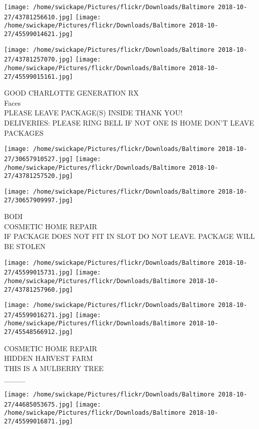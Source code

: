 \documentclass[10pt,letterpaper]{article}
\begin{document}
\texttt{[image: /home/swickape/Pictures/flickr/Downloads/Baltimore 2018-10-27/43781256610.jpg]}
\texttt{[image: /home/swickape/Pictures/flickr/Downloads/Baltimore 2018-10-27/45599014621.jpg]}

\texttt{[image: /home/swickape/Pictures/flickr/Downloads/Baltimore 2018-10-27/43781257070.jpg]}
\texttt{[image: /home/swickape/Pictures/flickr/Downloads/Baltimore 2018-10-27/45599015161.jpg]}

GOOD CHARLOTTE GENERATION RX\\
Faces\\
PLEASE LEAVE PACKAGE(S) INSIDE THANK YOU!\\
DELIVERIES: PLEASE RING BELL IF NOT ONE IS HOME DON'T LEAVE PACKAGES
\pagebreak

\texttt{[image: /home/swickape/Pictures/flickr/Downloads/Baltimore 2018-10-27/30657910527.jpg]}
\texttt{[image: /home/swickape/Pictures/flickr/Downloads/Baltimore 2018-10-27/43781257520.jpg]}

\vspace{0.25in}
\texttt{[image: /home/swickape/Pictures/flickr/Downloads/Baltimore 2018-10-27/30657909997.jpg]}

BODI\\
COSMETIC HOME REPAIR\\
IF PACKAGE DOES NOT FIT IN SLOT DO NOT LEAVE.  PACKAGE WILL BE STOLEN
\pagebreak

\texttt{[image: /home/swickape/Pictures/flickr/Downloads/Baltimore 2018-10-27/45599015731.jpg]}
\texttt{[image: /home/swickape/Pictures/flickr/Downloads/Baltimore 2018-10-27/43781257960.jpg]}

\texttt{[image: /home/swickape/Pictures/flickr/Downloads/Baltimore 2018-10-27/45599016271.jpg]}
\texttt{[image: /home/swickape/Pictures/flickr/Downloads/Baltimore 2018-10-27/45548566912.jpg]}

COSMETIC HOME REPAIR\\
HIDDEN HARVEST FARM\\
THIS IS A MULBERRY TREE\\
\_\_\_\_
\pagebreak

\texttt{[image: /home/swickape/Pictures/flickr/Downloads/Baltimore 2018-10-27/44685053675.jpg]}
\texttt{[image: /home/swickape/Pictures/flickr/Downloads/Baltimore 2018-10-27/45599016871.jpg]}
\end{document}
